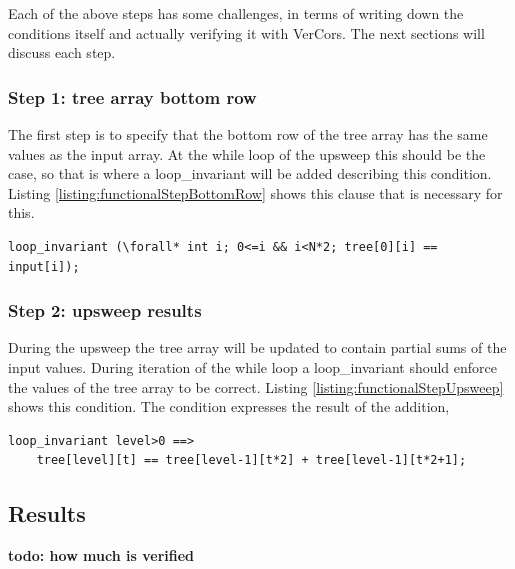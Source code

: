 \documentclass[a4paper]{article}
\newcommand{\todo}[1]{{\color{BurntOrange}\sffamily\textbf{todo: #1}\par}}
\begin{document}
Each of the above steps has some challenges, in terms of writing down the conditions itself and actually verifying it with VerCors. The next sections will discuss each step.

\subsubsection{Step 1: tree array bottom row}
The first step is to specify that the bottom row of the tree array has the same values as the input array. At the while loop of the upsweep this should be the case, so that is where a loop\_invariant will be added describing this condition. Listing \ref{listing:functionalStepBottomRow} shows this clause that is necessary for this.

\begin{lstlisting}[caption=Bottom row of the tree array is equal to the input array, label=listing:functionalStepBottomRow, float=htpb]
loop_invariant (\forall* int i; 0<=i && i<N*2; tree[0][i] == input[i]);
\end{lstlisting}

\subsubsection{Step 2: upsweep results}
During the upsweep the tree array will be updated to contain partial sums of the input values. During iteration of the while loop a loop\_invariant should enforce the values of the tree array to be correct. Listing \ref{listing:functionalStepUpsweep} shows this condition. The condition expresses the result of the addition, 

\begin{lstlisting}[caption=Upsweep loop\_invariant enforcing the results of the computation, label=listing:functionalStepUpsweep, float=htpb]
loop_invariant level>0 ==> 
	tree[level][t] == tree[level-1][t*2] + tree[level-1][t*2+1];
\end{lstlisting}



\subsection{Results}
\todo{how much is verified}



\end{document}
